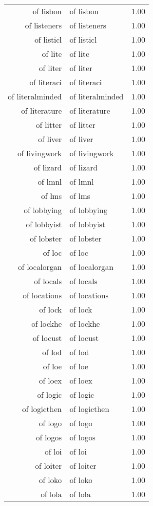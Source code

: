 \begin{table}[ht]
\begin{tabular}{rlr}
  of lisbon & of lisbon & 1.00 \\ 
  of listeners & of listeners & 1.00 \\ 
  of listicl & of listicl & 1.00 \\ 
  of lite & of lite & 1.00 \\ 
  of liter & of liter & 1.00 \\ 
  of literaci & of literaci & 1.00 \\ 
  of literalminded & of literalminded & 1.00 \\ 
  of literature & of literature & 1.00 \\ 
  of litter & of litter & 1.00 \\ 
  of liver & of liver & 1.00 \\ 
  of livingwork & of livingwork & 1.00 \\ 
  of lizard & of lizard & 1.00 \\ 
  of lmnl & of lmnl & 1.00 \\ 
  of lms & of lms & 1.00 \\ 
  of lobbying & of lobbying & 1.00 \\ 
  of lobbyist & of lobbyist & 1.00 \\ 
  of lobster & of lobster & 1.00 \\ 
  of loc & of loc & 1.00 \\ 
  of localorgan & of localorgan & 1.00 \\ 
  of locals & of locals & 1.00 \\ 
  of locations & of locations & 1.00 \\ 
  of lock & of lock & 1.00 \\ 
  of lockhe & of lockhe & 1.00 \\ 
  of locust & of locust & 1.00 \\ 
  of lod & of lod & 1.00 \\ 
  of loe & of loe & 1.00 \\ 
  of loex & of loex & 1.00 \\ 
  of logic & of logic & 1.00 \\ 
  of logicthen & of logicthen & 1.00 \\ 
  of logo & of logo & 1.00 \\ 
  of logos & of logos & 1.00 \\ 
  of loi & of loi & 1.00 \\ 
  of loiter & of loiter & 1.00 \\ 
  of loko & of loko & 1.00 \\ 
  of lola & of lola & 1.00 \\ 

\end{tabular}
\end{table}
